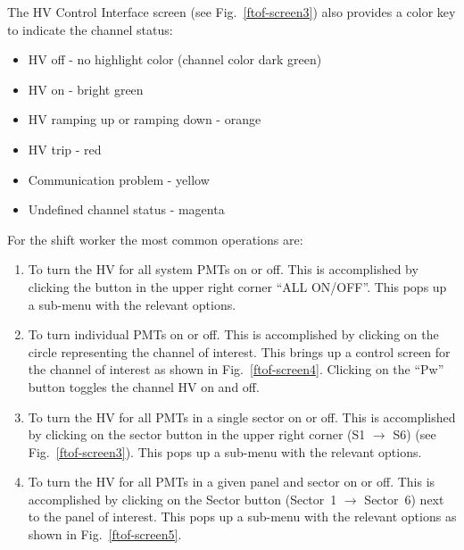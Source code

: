 \documentclass[12pt]{article}
\begin{document}
The HV Control Interface screen (see Fig.~\ref{ftof-screen3}) also provides a color key to indicate 
the channel status:

\begin{itemize}
\item HV off - no highlight color (channel color dark green)
\item HV on - bright green
\item HV ramping up or ramping down - orange
\item HV trip - red
\item Communication problem - yellow
\item Undefined channel status - magenta
\end{itemize}

For the shift worker the most common operations are:

\begin{enumerate}
\item To turn the HV for all system PMTs on or off. This is accomplished by clicking the button in 
the upper right corner ``ALL ON/OFF''. This pops up a sub-menu with the relevant options.
\item To turn individual PMTs on or off. This is accomplished by clicking on the circle representing 
the channel of interest. This brings up a control screen for the channel of interest as shown in
Fig.~\ref{ftof-screen4}. Clicking on the ``Pw'' button toggles the channel HV on and off.
\item To turn the HV for all PMTs in a single sector on or off. This is accomplished by clicking on 
the sector button in the upper right corner (S1 $\to$ S6) (see Fig.~\ref{ftof-screen3}). This pops 
up a sub-menu with the relevant options.
\item To turn the HV for all PMTs in a given panel and sector on or off. This is accomplished by
clicking on the Sector button (Sector~1 $\to$ Sector~6) next to the panel of interest. This pops
up a sub-menu with the relevant options as shown in Fig.~\ref{ftof-screen5}.
\end{enumerate}
\end{document}
